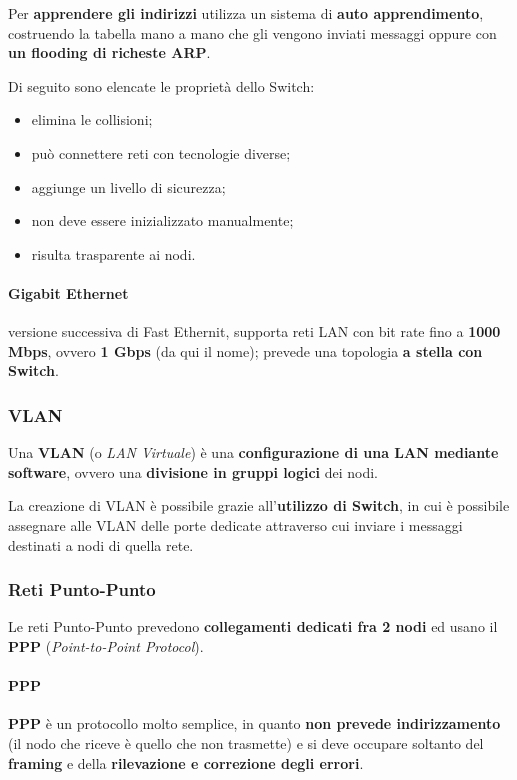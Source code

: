 \documentclass[a4paper]{article}
\begin{document}
 							Per \textbf{apprendere gli indirizzi} utilizza un sistema di \textbf{auto apprendimento}, costruendo la tabella mano a mano che gli vengono inviati messaggi oppure con \textbf{un flooding di richeste ARP}.
 							
 							Di seguito sono elencate le proprietà dello Switch:
 							\begin{itemize}
 								\item elimina le collisioni;
 								\item può connettere reti con tecnologie diverse;
 								\item aggiunge un livello di sicurezza;
 								\item non deve essere inizializzato manualmente;
 								\item risulta trasparente ai nodi.
 							\end{itemize}
 							
 					\paragraph{Gigabit Ethernet}
 						versione successiva di Fast Ethernit, supporta reti LAN con bit rate fino a \textbf{1000 Mbps}, ovvero \textbf{1 Gbps} (da qui il nome); prevede una topologia \textbf{a stella con Switch}.
 						
 					
 		\subsubsection{VLAN}
 			
 			Una \textbf{VLAN} (o \emph{LAN Virtuale}) è una \textbf{configurazione di una LAN mediante software}, ovvero una \textbf{divisione in gruppi logici} dei nodi.
 			
 			La creazione di VLAN è possibile grazie all'\textbf{utilizzo di Switch}, in cui è possibile assegnare alle VLAN delle porte dedicate attraverso cui inviare i messaggi destinati a nodi di quella rete.
 			
 		
 		\subsubsection{Reti Punto-Punto}
 			
 			Le reti Punto-Punto prevedono \textbf{collegamenti dedicati fra 2 nodi} ed usano il \textbf{PPP} (\emph{Point-to-Point Protocol}).
 			
 			\paragraph{PPP}
 				\textbf{PPP} è un protocollo molto semplice, in quanto \textbf{non prevede indirizzamento} (il nodo che riceve è quello che non trasmette) e si deve occupare soltanto del \textbf{framing} e della \textbf{rilevazione e correzione degli errori}.
 				
\end{document}

